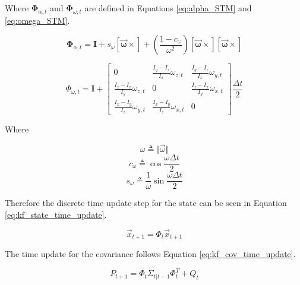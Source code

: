 Where $\boldsymbol{\Phi}_{\alpha,t}$ and $\boldsymbol{\Phi}_{\omega,t}$ are defined in Equations \ref{eq:alpha_STM} and \ref{eq:omega_STM}.

\begin{equation} \label{eq:alpha_STM}
    \boldsymbol{\Phi}_{\alpha,t} = \boldsymbol{I} + s_{\omega} \boldsymbol{\left[ \vec{\omega} \times \right]} + \left( \frac{1 - c_{\omega}}{\omega ^2} \right) \boldsymbol{\left[ \vec{\omega} \times \right]} \boldsymbol{\left[ \vec{\omega} \times \right]}
\end{equation}

\begin{equation} \label{eq:omega_STM}
    \Phi_{\omega,t} = \boldsymbol{I} + \begin{bmatrix}
        0 & \frac{I_y - I_z}{I_x} \omega_{z,t} & \frac{I_y - I_z}{I_x} \omega_{y,t} \\
        \frac{I_z - I_x}{I_y} \omega_{z,t} & 0 & \frac{I_z - I_x}{I_y} \omega_{x,t} \\
        \frac{I_x - I_y}{I_z} \omega_{y,t} & \frac{I_x - I_y}{I_z} \omega_{x,t} & 0
    \end{bmatrix} \frac{\Delta t}{2}
\end{equation}

Where

\begin{equation*}
    \omega \triangleq \Vert \vec{\omega} \Vert
\end{equation*}
\begin{equation*}
    c_{\omega} \triangleq \cos{\frac{\omega \Delta t}{2}}
\end{equation*}
\begin{equation*}
    s_{\omega} \triangleq \frac{1}{\omega} \sin{\frac{\omega \Delta t}{2}}
\end{equation*}

Therefore the discrete time update step for the state can be seen in Equation \ref{eq:kf_state_time_update}.

\begin{equation} \label{eq:kf_state_time_update}
    \vec{x}_{t + 1} = \Phi_t \vec{x}_{t + 1}
\end{equation}

The time update for the covariance follows Equation \ref{eq:kf_cov_time_update}.

\begin{equation} \label{eq:kf_cov_time_update}
    P_{t + 1} = \Phi_t \Sigma_{t \vert t-1} \Phi_t^T + Q_t
\end{equation}

